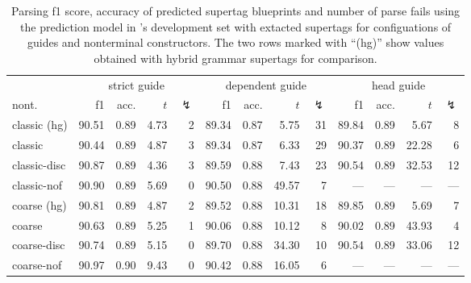 \documentclass[../../document.tex]{subfiles}
\begin{document}
    \begin{table}
        \caption{\label{tbl:gridsearch:dcp:3}
        Parsing f1 score, accuracy of predicted supertag blueprints and number of parse fails using the  prediction model in \negra{}'s development set with extacted  supertags for configuations of guides and nonterminal constructors. The two rows marked with ``(hg)'' show values obtained with hybrid grammar supertags for comparison.
        }
        \centering
        \setlength{\tabcolsep}{5pt}
        \vspace{.2cm}
        \begin{tabular}{l|rrrr|rrrr|rrrr}
            \toprule
            & \multicolumn{4}{c|}{strict guide} &  \multicolumn{4}{c|}{dependent guide} &  \multicolumn{4}{c}{head guide} \\
nont.           & f1 & acc. & $t$ & $\lightning$ & f1 & acc. & $t$ & $\lightning$ & f1 & acc. & $t$ & $\lightning$  \\ \hline
\rowcolor{black!10}
classic (hg) & 90.51 & 0.89 & 4.73 & 2 & 89.34 & 0.87 &  5.75 & 31 & 89.84 & 0.89 &  5.67 & 8 \\\hline
classic      & 90.44 & 0.89 & 4.87 & 3 & 89.34 & 0.87 &  6.33 & 29 & 90.37 & 0.89 & 22.28 & 6 \\
classic-disc & 90.87 & 0.89 & 4.36 & 3 & 89.59 & 0.88 &  7.43 & 23 & 90.54 & 0.89 & 32.53 & 12 \\
classic-nof  & 90.90 & 0.89 & 5.69 & 0 & 90.50 & 0.88 & 49.57 &  7 &   --- &  --- &   --- & --- \\ \hline
\rowcolor{black!10}
coarse (hg) & 90.81 & 0.89 & 4.87 & 2 & 89.52 & 0.88 & 10.31 & 18 & 89.85 & 0.89 &  5.69 & 7 \\ \hline
coarse      & 90.63 & 0.89 & 5.25 & 1 & 90.06 & 0.88 & 10.12 &  8 & 90.02 & 0.89 & 43.93 & 4 \\
coarse-disc & 90.74 & 0.89 & 5.15 & 0 & 89.70 & 0.88 & 34.30 & 10 & 90.54 & 0.89 & 33.06 & 12 \\
coarse-nof  & 90.97 & 0.90 & 9.43 & 0 & 90.42 & 0.88 & 16.05 &  6 &   --- &  --- &   --- & --- \\
\bottomrule
        \end{tabular}
    \end{table}
\end{document}
